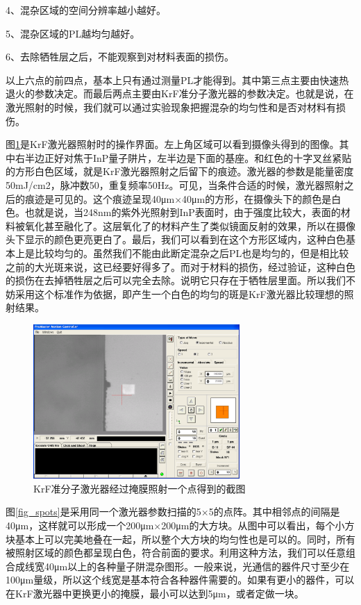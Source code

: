 \documentclass{ZJUthesis}
\begin{document}
4、混杂区域的空间分辨率越小越好。

5、混杂区域的PL越均匀越好。

6、去除牺牲层之后，不能观察到对材料表面的损伤。

以上六点的前四点，基本上只有通过测量PL才能得到。其中第三点主要由快速热退火的参数决定。而最后两点主要由KrF准分子激光器的参数决定。也就是说，在激光照射的时候，我们就可以通过实验现象把握混杂的均匀性和是否对材料有损伤。

图\ref{fig_spot}是KrF激光器照射时的操作界面。左上角区域可以看到摄像头得到的图像。其中右半边正好对焦于InP量子阱片，左半边是下面的基座。和红色的十字叉丝紧贴的方形白色区域，就是KrF激光器照射之后留下的痕迹。激光器的参数是能量密度50mJ/cm2，脉冲数50，重复频率50Hz。可见，当条件合适的时候，激光器照射之后的痕迹是可见的。这个痕迹呈现40μm×40μm的方形，在摄像头下的颜色是白色。也就是说，当248nm的紫外光照射到InP表面时，由于强度比较大，表面的材料被氧化甚至融化了。这层氧化了的材料产生了类似镜面反射的效果，所以在摄像头下显示的颜色更亮更白了。最后，我们可以看到在这个方形区域内，这种白色基本上是比较均匀的。虽然我们不能由此断定混杂之后PL也是均匀的，但是相比较之前的大光斑来说，这已经要好得多了。而对于材料的损伤，经过验证，这种白色的损伤在去掉牺牲层之后可以完全去除。说明它只存在于牺牲层里面。所以我们不妨采用这个标准作为依据，即产生一个白色的均匀的斑是KrF激光器比较理想的照射结果。

\begin{figure}[!t]
    \centering
    \includegraphics[width=0.7\textwidth]{./Pictures/spot.eps}
    \caption{KrF准分子激光器经过掩膜照射一个点得到的截图}
    \label{fig_spot}
\end{figure}

图\ref{fig_spots}是采用同一个激光器参数扫描的5×5的点阵。其中相邻点的间隔是40μm，这样就可以形成一个200μm×200μm的大方块。从图中可以看出，每个小方块基本上可以完美地叠在一起，所以整个大方块的均匀性也是可以的。同时，所有被照射区域的颜色都呈现白色，符合前面的要求。利用这种方法，我们可以任意组合成线宽40μm以上的各种量子阱混杂图形。一般来说，光通信的器件尺寸至少在100μm量级，所以这个线宽是基本符合各种器件需要的。如果有更小的器件，可以在KrF激光器中更换更小的掩膜，最小可以达到5μm，或者定做一块。
\end{document}
